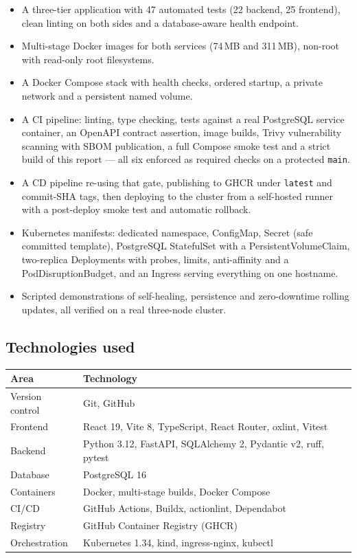 \documentclass[10pt,a4paper]{article}
\newcommand{\cd}[1]{\texttt{\small #1}}
\begin{document}
\begin{itemize}
  \item A three-tier application with 47 automated tests (22 backend, 25
        frontend), clean linting on both sides and a database-aware health
        endpoint.
  \item Multi-stage Docker images for both services (74\,MB and 311\,MB),
        non-root with read-only root filesystems.
  \item A Docker Compose stack with health checks, ordered startup, a private
        network and a persistent named volume.
  \item A CI pipeline: linting, type checking, tests against a real
        PostgreSQL service container, an OpenAPI contract assertion, image
        builds, Trivy vulnerability scanning with SBOM publication, a full
        Compose smoke test and a strict build of this report --- all six
        enforced as required checks on a protected \cd{main}.
  \item A CD pipeline re-using that gate, publishing to GHCR under
        \cd{latest} and commit-SHA tags, then deploying to the cluster from a
        self-hosted runner with a post-deploy smoke test and automatic
        rollback.
  \item Kubernetes manifests: dedicated namespace, ConfigMap, Secret (safe
        committed template), PostgreSQL StatefulSet with a
        PersistentVolumeClaim, two-replica Deployments with probes, limits,
        anti-affinity and a PodDisruptionBudget, and an Ingress serving
        everything on one hostname.
  \item Scripted demonstrations of self-healing, persistence and
        zero-downtime rolling updates, all verified on a real three-node
        cluster.
\end{itemize}

\subsection{Technologies used}

\begin{center}
\begin{tabular}{@{}ll@{}}
\toprule
\textbf{Area} & \textbf{Technology} \\
\midrule
Version control & Git, GitHub \\
Frontend        & React 19, Vite 8, TypeScript, React Router, oxlint, Vitest \\
Backend         & Python 3.12, FastAPI, SQLAlchemy 2, Pydantic v2, ruff, pytest \\
Database        & PostgreSQL 16 \\
Containers      & Docker, multi-stage builds, Docker Compose \\
CI/CD           & GitHub Actions, Buildx, actionlint, Dependabot \\
Registry        & GitHub Container Registry (GHCR) \\
Orchestration   & Kubernetes 1.34, kind, ingress-nginx, kubectl \\
\bottomrule
\end{tabular}
\end{center}
\end{document}
